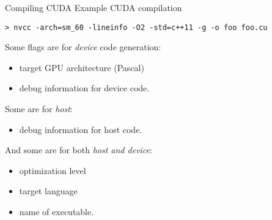 \documentclass[aspectratio=43]{beamer}
\begin{document}

\begin{frame}[fragile]{Compiling CUDA}
    Example CUDA compilation
    \begin{terminal}{}
    \begin{lstlisting}[style=terminal]
> nvcc -arch=sm_60 -lineinfo -O2 -std=c++11 -g -o foo foo.cu
    \end{lstlisting}
    \end{terminal}
    Some flags are for \emph{device} code generation:
    \begin{itemize}
        \item {} target GPU architecture (Pascal)
        \item {} debug information for device code.
    \end{itemize}
    Some are for \emph{host}:
    \begin{itemize}
        \item {} debug information for host code.
    \end{itemize}
    And some are for both \emph{host and device}:
    \begin{itemize}
        \item {} optimization level
        \item {} target language
        \item {} name of executable.
    \end{itemize}
\end{frame}

%
\end{document}

